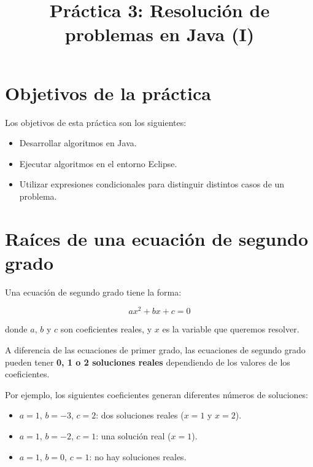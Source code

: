 \documentclass[
  spanish,
  11pt,
  a4paper,
  DIV=11,
  numbers=noendperiod]{scrartcl}
\title{Práctica 3: Resolución de problemas en Java (I)}
\author{}
\date{}
\providecommand{\tightlist}{\setlength{\itemsep}{0pt}\setlength{\parskip}{0pt}}
\begin{document}
\maketitle

\renewcommand*\contentsname{Tabla de contenidos}
{
\hypersetup{linkcolor=}
\setcounter{tocdepth}{2}
\tableofcontents
}

\clearpage

\section{Objetivos de la práctica}\label{objetivos-de-la-practica}

Los objetivos de esta práctica son los siguientes:

\begin{itemize}
\tightlist
\item Desarrollar algoritmos en Java.
\item Ejecutar algoritmos en el entorno Eclipse.
\item Utilizar expresiones condicionales para distinguir distintos casos de un problema.
\end{itemize}

\section{Raíces de una ecuación de segundo grado}\label{raices-de-una-ecuacion-de-segundo-grado}

Una ecuación de segundo grado tiene la forma:

\[
ax^2 + bx + c = 0
\]

donde \(a\), \(b\) y \(c\) son coeficientes reales, y \(x\) es la variable que queremos resolver.

A diferencia de las ecuaciones de primer grado, las ecuaciones de segundo grado pueden tener \textbf{0, 1 o 2 soluciones reales} dependiendo de los valores de los coeficientes.

Por ejemplo, los siguientes coeficientes generan diferentes números de soluciones:

\begin{itemize}
\tightlist
\item \(a=1\), \(b=-3\), \(c=2\): dos soluciones reales (\(x=1\) y \(x=2\)).
\item \(a=1\), \(b=-2\), \(c=1\): una solución real (\(x=1\)).
\item \(a=1\), \(b=0\), \(c=1\): no hay soluciones reales.
\end{itemize}
\end{document}
